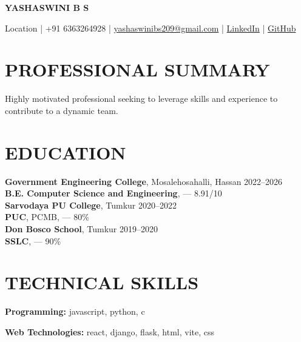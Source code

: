 \documentclass[10pt,a4paper]{extarticle}
\begin{document}

\begin{center}

{\Large \textbf{YASHASWINI B S}}

\vspace{1pt}

Location |
+91 6363264928 |
\href{mailto:yashaswinibs209@gmail.com}{yashaswinibs209@gmail.com} |
\href{https://linkedin.com/in/yashaswini-b-s-b995a7330}{LinkedIn} |
\href{https://github.com/yashaswini-s-naik}{GitHub}

\end{center}


\section*{PROFESSIONAL SUMMARY}

Highly motivated professional seeking to leverage skills and experience to contribute to a dynamic team.


\section*{EDUCATION}

\noindent \textbf{Government Engineering College}, Mosalehosahalli, Hassan \hfill 2022–2026\\
\noindent \textbf{B.E. Computer Science and Engineering}, — \hfill 8.91/10\\
\noindent \textbf{Sarvodaya PU College}, Tumkur \hfill 2020–2022\\
\noindent \textbf{PUC}, PCMB, — \hfill 80\%\\
\noindent \textbf{Don Bosco School}, Tumkur \hfill 2019–2020\\
\noindent \textbf{SSLC}, — \hfill 90\%\\



\section*{TECHNICAL SKILLS}

\textbf{Programming:} javascript, python, c

\textbf{Web Technologies:} react, django, flask, html, vite, css
\end{document}
